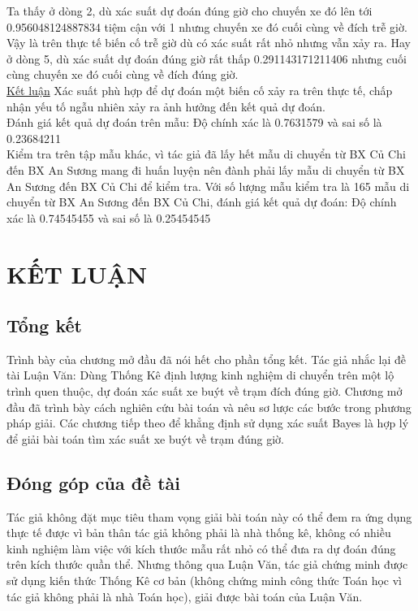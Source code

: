 \documentclass[a4paper, 13pt]{report}
\begin{document}
Ta thấy ở dòng 2, dù xác suất dự đoán đúng giờ cho chuyến xe đó lên tới 0.956048124887834 tiệm cận với 1 nhưng chuyến xe đó cuối cùng về đích trễ giờ. Vậy là trên thực tế biến cố trễ giờ dù có xác suất rất nhỏ nhưng vẫn xảy ra. Hay ở dòng 5, dù xác suất dự đoán đúng giờ rất thấp 0.291143171211406 nhưng cuối cùng chuyến xe đó cuối cùng về đích đúng giờ.\\
\underline{Kết luận} Xác suất phù hợp để dự đoán một biến cố xảy ra trên thực tế, chấp nhận yếu tố ngẫu nhiên xảy ra ảnh hưởng đến kết quả dự đoán.\\
Đánh giá kết quả dự đoán trên mẫu: Độ chính xác là 0.7631579 và sai số là 0.23684211\\ 
Kiểm tra trên tập mẫu khác, vì tác giả đã lấy hết mẫu di chuyển từ BX Củ Chi đến BX An Sương mang đi huấn luyện nên đành phải lấy mẫu di chuyển từ BX An Sương đến BX Củ Chi để kiểm tra. Với số lượng mẫu kiểm tra là 165 mẫu di chuyển từ BX An Sương đến BX Củ Chi, đánh giá kết quả dự đoán: Độ chính xác là 0.74545455 và sai số là 0.25454545
\chapter{KẾT LUẬN}
\section{Tổng kết}
Trình bày của chương mở đầu đã nói hết cho phần tổng kết. Tác giả nhắc lại đề tài Luận Văn: Dùng Thống Kê định lượng kinh nghiệm di chuyển trên một lộ trình quen thuộc, dự đoán xác suất xe buýt về trạm đích đúng giờ. Chương mở đầu đã trình bày cách nghiên cứu bài toán và nêu sơ lược các bước trong phương pháp giải. Các chương tiếp theo để khẳng định sử dụng xác suất Bayes là hợp lý để giải bài toán tìm xác suất xe buýt về trạm đúng giờ. 
\section{Đóng góp của đề tài}
Tác giả không đặt mục tiêu tham vọng giải bài toán này có thể đem ra ứng dụng thực tế được vì bản thân tác giả không phải là nhà thống kê, không có nhiều kinh nghiệm làm việc với kích thước mẫu rất nhỏ có thể đưa ra dự đoán đúng trên kích thước quần thể. Nhưng thông qua Luận Văn, tác giả chứng minh được sử dụng kiến thức Thống Kê cơ bản (không chứng minh công thức Toán học vì tác giả không phải là nhà Toán học), giải được bài toán của Luận Văn.
\end{document}
